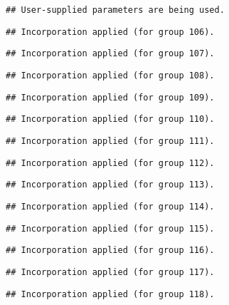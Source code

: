 \documentclass[
  landscape]{article}
\begin{document}
\begin{verbatim}
## User-supplied parameters are being used.
\end{verbatim}

\begin{verbatim}
## Incorporation applied (for group 106).
\end{verbatim}

\begin{verbatim}
## Incorporation applied (for group 107).
\end{verbatim}

\begin{verbatim}
## Incorporation applied (for group 108).
\end{verbatim}

\begin{verbatim}
## Incorporation applied (for group 109).
\end{verbatim}

\begin{verbatim}
## Incorporation applied (for group 110).
\end{verbatim}

\begin{verbatim}
## Incorporation applied (for group 111).
\end{verbatim}

\begin{verbatim}
## Incorporation applied (for group 112).
\end{verbatim}

\begin{verbatim}
## Incorporation applied (for group 113).
\end{verbatim}

\begin{verbatim}
## Incorporation applied (for group 114).
\end{verbatim}

\begin{verbatim}
## Incorporation applied (for group 115).
\end{verbatim}

\begin{verbatim}
## Incorporation applied (for group 116).
\end{verbatim}

\begin{verbatim}
## Incorporation applied (for group 117).
\end{verbatim}

\begin{verbatim}
## Incorporation applied (for group 118).
\end{verbatim}
\end{document}
